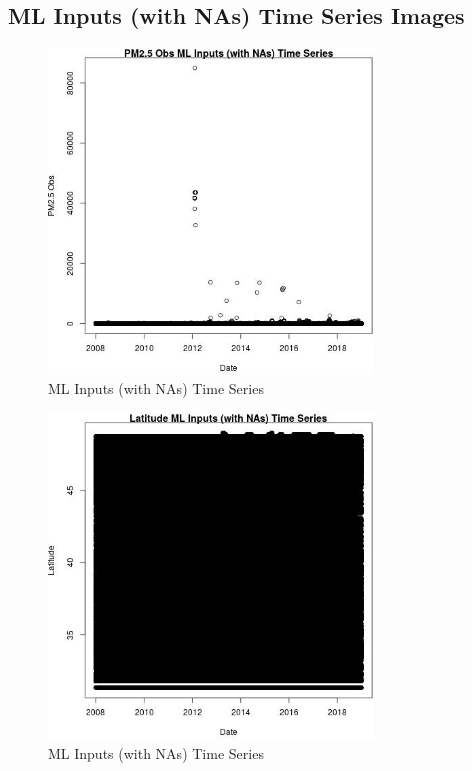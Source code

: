 
\subsection{ML Inputs (with NAs) Time Series Images} 
 

\begin{figure} 
\centering  
\includegraphics[width=0.77\textwidth]{Code_Outputs/Report_ML_input_PM25_Step4_part_f_de_duplicated_aves_prioritize_24hr_obswNAs_PM25_ObsvDate.jpg} 
\caption{\label{fig:Report_ML_input_PM25_Step4_part_f_de_duplicated_aves_prioritize_24hr_obswNAsPM25_ObsvDate}ML Inputs (with NAs) Time Series} 
\end{figure} 
 

\begin{figure} 
\centering  
\includegraphics[width=0.77\textwidth]{Code_Outputs/Report_ML_input_PM25_Step4_part_f_de_duplicated_aves_prioritize_24hr_obswNAs_LatitudevDate.jpg} 
\caption{\label{fig:Report_ML_input_PM25_Step4_part_f_de_duplicated_aves_prioritize_24hr_obswNAsLatitudevDate}ML Inputs (with NAs) Time Series} 
\end{figure} 
 

